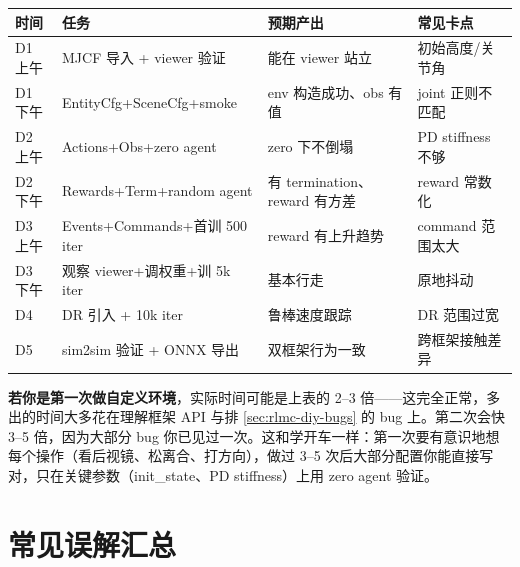 \begin{center}
\small
\begin{tabular}{@{}lp{4.4cm}p{3.4cm}p{3.0cm}@{}}
\toprule
时间 & 任务 & 预期产出 & 常见卡点 \\
\midrule
D1 上午 & MJCF 导入 + viewer 验证 & 能在 viewer 站立 & 初始高度/关节角 \\
D1 下午 & EntityCfg+SceneCfg+smoke & env 构造成功、obs 有值 & joint 正则不匹配 \\
D2 上午 & Actions+Obs+zero agent & zero 下不倒塌 & PD stiffness 不够 \\
D2 下午 & Rewards+Term+random agent & 有 termination、reward 有方差 & reward 常数化 \\
D3 上午 & Events+Commands+首训 500 iter & reward 有上升趋势 & command 范围太大 \\
D3 下午 & 观察 viewer+调权重+训 5k iter & 基本行走 & 原地抖动 \\
D4 & DR 引入 + 10k iter & 鲁棒速度跟踪 & DR 范围过宽 \\
D5 & sim2sim 验证 + ONNX 导出 & 双框架行为一致 & 跨框架接触差异 \\
\bottomrule
\end{tabular}
\end{center}

\textbf{若你是第一次做自定义环境}，实际时间可能是上表的 2--3 倍——这完全正常，多出的时间大多花在理解框架 API 与排 \cref{sec:rlmc-diy-bugs} 的 bug 上。第二次会快 3--5 倍，因为大部分 bug 你已见过一次。这和学开车一样：第一次要有意识地想每个操作（看后视镜、松离合、打方向），做过 3--5 次后大部分配置你能直接写对，只在关键参数（init\_state、PD stiffness）上用 zero agent 验证。

\section{常见误解汇总}
\label{sec:rlmc-diy-myths}

